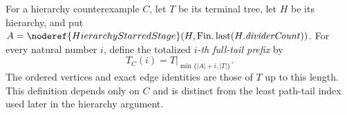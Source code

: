 \begin{definition}
For a hierarchy counterexample \(C\), let \(T\) be its terminal tree, let
\(H\) be its hierarchy, and put
\(A=\noderef{HierarchyStarredStage}(H,\operatorname{Fin.last}
(H.\mathit{dividerCount}))\).  For every natural number \(i\), define the
totalized \emph{\(i\)-th full-tail prefix} by
\[
 T_C(i)
   =T\big|_{\min\{|A|+i,|T|\}}.
\]
The ordered vertices and exact edge identities are those of \(T\) up to this
length.  This definition depends only on \(C\) and is distinct from the least
path-tail index used later in the hierarchy argument.
\end{definition}
